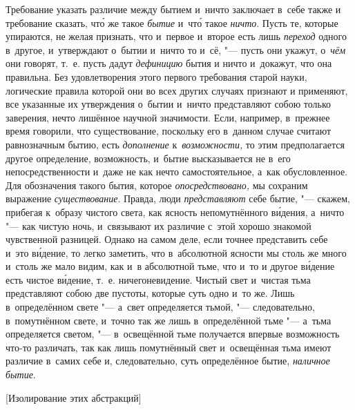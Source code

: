 Требование указать различие между бытием и~ничто заключает в~себе также и
требование сказать, чт\'{о} же такое {\em бытие} и~чт\'{о} такое {\em ничто}.
Пусть те, которые упираются, не желая признать, что и~первое и~второе есть лишь
{\em переход} одного в~другое, и~утверждают о~бытии и~ничто то и~сё, "--- пусть
они укажут, о~{\em чём} они говорят, т.~е. пусть дадут {\em дефиницию} бытия и
ничто и~докажут, что она правильна. Без удовлетворения этого первого требования
старой науки, логические правила которой они во всех других случаях признают и
применяют, все указанные их утверждения о~бытии и~ничто представляют собою
только заверения, нечто лишённое научной значимости. Если, например, в~прежнее
время говорили, что существование, поскольку его в~данном случае считают
равнозначным бытию, есть {\em дополнение} к~{\em возможности,} то этим
предполагается другое определение, возможность, и~бытие высказывается не в~его
непосредственности и~даже не как нечто самостоятельное, а~как обусловленное.
Для обозначения такого бытия, которое {\em опосредствовано,} мы сохраним
выражение {\em существование}. Правда, люди {\em представляют} себе бытие, "---
скажем, прибегая к~образу чистого света, как ясность непомутнённого
в\'{и}дения, а~ничто "--- как чистую ночь, и~связывают их различие с~этой
хорошо знакомой чувственной разницей. Однако на самом деле, если точнее
представить себе и~это в\'{и}дение, то легко заметить, что в~абсолютной ясности
мы столь же много и~столь же мало видим, как и~в абсолютной тьме, что и~то и
другое в\'{и}дение есть чистое в\'{и}дение, т.~е. ничегоневидение. Чистый свет
и~чистая тьма представляют собою две пустоты, которые суть одно и~то же. Лишь
в~определённом свете "--- а~свет определяется тьмой, "--- следовательно,
в~помутнённом свете, и~точно так же лишь в~определённой тьме "--- а~тьма
определяется светом, "--- в~освещённой тьме получается впервые возможность
что-то различать, так как лишь помутнённый свет и~освещённая тьма имеют
различие в~самих себе и, следовательно, суть определённое бытие,
{\em наличное бытие}.

%
{[Изолирование этих абстракций]}

